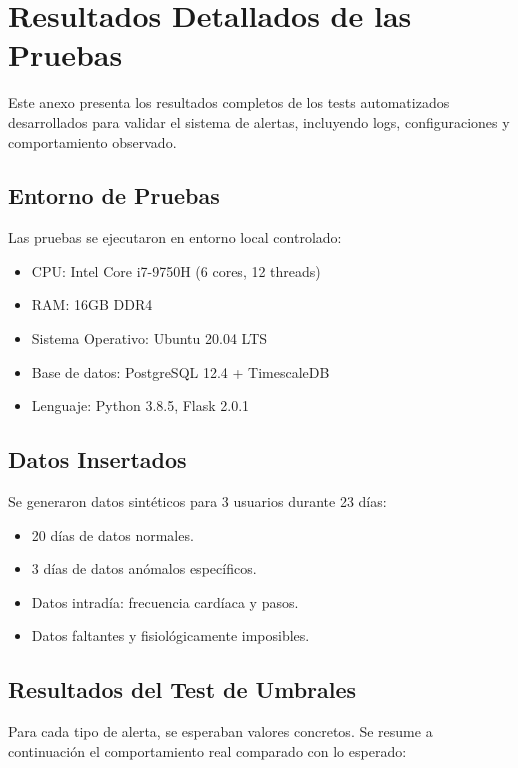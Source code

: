 \chapter{Resultados Detallados de las Pruebas}
\label{anexo:pruebas}

Este anexo presenta los resultados completos de los tests automatizados desarrollados para validar el sistema de alertas, incluyendo logs, configuraciones y comportamiento observado.

\section{Entorno de Pruebas}
\label{anexo:pruebas:entorno}

Las pruebas se ejecutaron en entorno local controlado:
\begin{itemize}
    \item CPU: Intel Core i7-9750H (6 cores, 12 threads)
    \item RAM: 16GB DDR4
    \item Sistema Operativo: Ubuntu 20.04 LTS
    \item Base de datos: PostgreSQL 12.4 + TimescaleDB
    \item Lenguaje: Python 3.8.5, Flask 2.0.1
\end{itemize}

\section{Datos Insertados}
\label{anexo:pruebas:insertados}

Se generaron datos sintéticos para 3 usuarios durante 23 días:

\begin{itemize}
    \item 20 días de datos normales.
    \item 3 días de datos anómalos específicos.
    \item Datos intradía: frecuencia cardíaca y pasos.
    \item Datos faltantes y fisiológicamente imposibles.
\end{itemize}

\section{Resultados del Test de Umbrales}
\label{anexo:pruebas:umbrales}

Para cada tipo de alerta, se esperaban valores concretos. Se resume a continuación el comportamiento real comparado con lo esperado:

